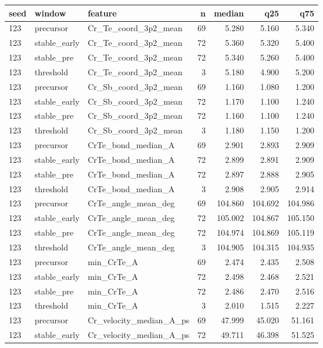 \begin{tabular}{lllrrrr}
seed & window & feature & n & median & q25 & q75 \\
\hline
123 & precursor & Cr_Te_coord_3p2_mean & 69 & 5.280 & 5.160 & 5.340 \\
123 & stable_early & Cr_Te_coord_3p2_mean & 72 & 5.360 & 5.320 & 5.400 \\
123 & stable_pre & Cr_Te_coord_3p2_mean & 72 & 5.340 & 5.260 & 5.400 \\
123 & threshold & Cr_Te_coord_3p2_mean & 3 & 5.180 & 4.900 & 5.200 \\
123 & precursor & Cr_Sb_coord_3p2_mean & 69 & 1.160 & 1.080 & 1.200 \\
123 & stable_early & Cr_Sb_coord_3p2_mean & 72 & 1.170 & 1.100 & 1.240 \\
123 & stable_pre & Cr_Sb_coord_3p2_mean & 72 & 1.160 & 1.100 & 1.240 \\
123 & threshold & Cr_Sb_coord_3p2_mean & 3 & 1.180 & 1.150 & 1.200 \\
123 & precursor & CrTe_bond_median_A & 69 & 2.901 & 2.893 & 2.909 \\
123 & stable_early & CrTe_bond_median_A & 72 & 2.899 & 2.891 & 2.909 \\
123 & stable_pre & CrTe_bond_median_A & 72 & 2.897 & 2.888 & 2.905 \\
123 & threshold & CrTe_bond_median_A & 3 & 2.908 & 2.905 & 2.914 \\
123 & precursor & CrTe_angle_mean_deg & 69 & 104.860 & 104.692 & 104.986 \\
123 & stable_early & CrTe_angle_mean_deg & 72 & 105.002 & 104.867 & 105.150 \\
123 & stable_pre & CrTe_angle_mean_deg & 72 & 104.974 & 104.869 & 105.119 \\
123 & threshold & CrTe_angle_mean_deg & 3 & 104.905 & 104.315 & 104.935 \\
123 & precursor & min_CrTe_A & 69 & 2.474 & 2.435 & 2.508 \\
123 & stable_early & min_CrTe_A & 72 & 2.498 & 2.468 & 2.521 \\
123 & stable_pre & min_CrTe_A & 72 & 2.486 & 2.470 & 2.516 \\
123 & threshold & min_CrTe_A & 3 & 2.010 & 1.515 & 2.227 \\
123 & precursor & Cr_velocity_median_A_ps & 69 & 47.999 & 45.020 & 51.161 \\
123 & stable_early & Cr_velocity_median_A_ps & 72 & 49.711 & 46.398 & 51.525 \\

\end{tabular}
